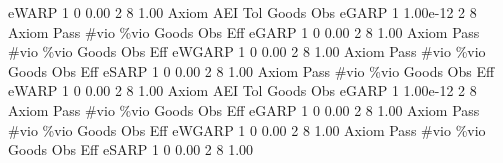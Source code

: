        eWARP {\VBAR}    1           0        0.00           2           8        1.00  
{\smallskip}
       Axiom {\VBAR}       AEI        Tol      Goods        Obs 
       eGARP {\VBAR}         1   1.00e-12          2          8 
{\smallskip}
{\smallskip}
{\smallskip}
       Axiom {\VBAR} Pass        \#vio        \%vio       Goods         Obs         Eff  
       eGARP {\VBAR}    1           0        0.00           2           8        1.00  
{\smallskip}
{\smallskip}
{\smallskip}
       Axiom {\VBAR} Pass        \#vio        \%vio       Goods         Obs         Eff  
      eWGARP {\VBAR}    1           0        0.00           2           8        1.00  
{\smallskip}
{\smallskip}
{\smallskip}
       Axiom {\VBAR} Pass        \#vio        \%vio       Goods         Obs         Eff  
       eSARP {\VBAR}    1           0        0.00           2           8        1.00  
{\smallskip}
{\smallskip}
{\smallskip}
       Axiom {\VBAR} Pass        \#vio        \%vio       Goods         Obs         Eff  
       eWARP {\VBAR}    1           0        0.00           2           8        1.00  
{\smallskip}
       Axiom {\VBAR}       AEI        Tol      Goods        Obs 
       eGARP {\VBAR}         1   1.00e-12          2          8 
{\smallskip}
{\smallskip}
{\smallskip}
       Axiom {\VBAR} Pass        \#vio        \%vio       Goods         Obs         Eff  
       eGARP {\VBAR}    1           0        0.00           2           8        1.00  
{\smallskip}
{\smallskip}
{\smallskip}
       Axiom {\VBAR} Pass        \#vio        \%vio       Goods         Obs         Eff  
      eWGARP {\VBAR}    1           0        0.00           2           8        1.00  
{\smallskip}
{\smallskip}
{\smallskip}
       Axiom {\VBAR} Pass        \#vio        \%vio       Goods         Obs         Eff  
       eSARP {\VBAR}    1           0        0.00           2           8        1.00  
{\smallskip}
